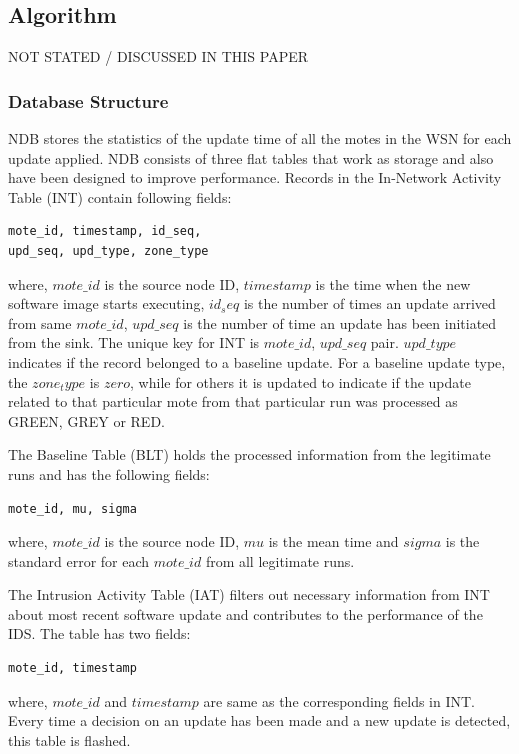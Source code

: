 \documentclass[conference,final]{IEEEtran}
\begin{document}
\subsection{Algorithm}
\label{subsec:alg}
NOT STATED / DISCUSSED IN THIS PAPER

\subsubsection{Database Structure}
\label{ssc:db}
NDB stores the statistics of the update time of all the motes in the WSN for each update applied.
NDB consists of three flat tables that work as storage and also have been designed to improve performance. 
Records in the In-Network Activity Table (INT) contain following fields:
\begin{verbatim}
mote_id, timestamp, id_seq, 
upd_seq, upd_type, zone_type
\end{verbatim}
where, $mote\_id$ is the source node ID, $timestamp$ is the time when the new software image starts executing, $id_seq$ is the number of times an update arrived from same $mote\_id$, $upd\_seq$ is the number of time an update has been initiated from the sink.
The unique key for INT is $mote\_id$, $upd\_seq$ pair.
$upd\_type$ indicates if the record belonged to a baseline update.
For a baseline update type, the $zone_type$ is $zero$, while for others it is updated to indicate if the update related to that particular mote from that particular run was processed as GREEN, GREY or RED.

The Baseline Table (BLT) holds the processed information from the legitimate runs and has the following fields:
\begin{verbatim}
mote_id, mu, sigma
\end{verbatim}
where, $mote\_id$ is the source node ID, $mu$ is the mean time and $sigma$ is the standard error for each $mote\_id$ from all legitimate runs.

The Intrusion Activity Table (IAT) filters out necessary information from INT about most recent software update and contributes to the performance of the IDS.
The table has two fields:
\begin{verbatim}
mote_id, timestamp
\end{verbatim}
where, $mote\_id$  and $timestamp$ are same as the corresponding fields in INT.
Every time a decision on an update has been made and a new update is detected, this table is flashed.
\end{document}

